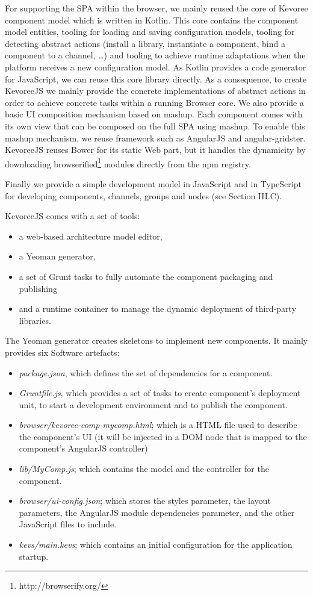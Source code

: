 For supporting the SPA within the browser, we mainly reused the core of Kevoree component model which is written in Kotlin. This core contains the component model entities, tooling for loading and saving configuration models, tooling for detecting abstract actions (install a library, instantiate a component, bind a component to a channel, \dots)  and tooling to achieve runtime adaptations when the platform receives a new configuration model. As Kotlin provides a code generator for JavaScript, we can reuse this core library directly. As a consequence, to create KevoreeJS we mainly provide the concrete implementations of abstract actions in order to achieve concrete tasks within a running Browser core. We also provide a basic UI composition mechanism based on mashup. Each component comes with its own view that can be composed on the full SPA using mashup. To enable this mashup mechanism, we reuse framework such as AngularJS and angular-gridster. KevoreeJS reuses Bower for its static Web part, but it handles the dynamicity by downloading browserified\footnote{http://browserify.org/} modules directly from the npm registry.


Finally we provide a simple development model in JavaScript and in TypeScript for developing components, channels, groups and nodes (see Section III.C).

KevoreeJS comes with a set of tools:

\begin{itemize}
	\item a web-based architecture model editor,
	\item a Yeoman generator,
	\item a set of Grunt tasks to fully automate the component packaging and publishing
	\item and a runtime container to manage the dynamic deployment of third-party libraries.
\end{itemize}


The Yeoman generator creates skeletons to implement new components. It mainly provides six Software artefacts:
\begin{itemize}
	\item \emph{package.json}, which defines the set of dependencies for a component.
	\item \emph{Gruntfile.js}, which provides a set of tasks to create component's deployment unit, to start a development environment and to publish the component.
	\item  \emph{browser/kevoree-comp-mycomp.html}; which is a HTML file used to describe the component's UI (it will be injected in a DOM node that is mapped to the component's AngularJS controller)
	\item \emph{lib/MyComp.js}; which contains the model and the controller for the component.
	\item \emph{browser/ui-config.json}; which stores the styles parameter, the layout parameters, the AngularJS module dependencies parameter, and the other JavaScript files to include.
	\item \emph{kevs/main.kevs}; which contains an initial configuration for the application startup.
\end{itemize}


